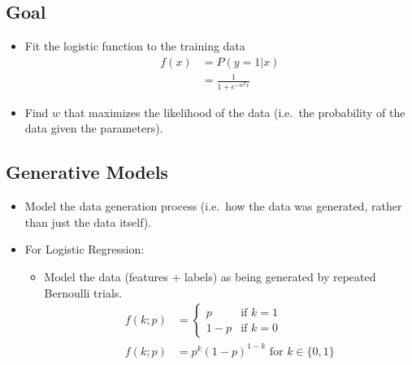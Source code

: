 \documentclass[12pt]{article}
\begin{document}
        \subsection{Goal}
            \begin{itemize}
                \item Fit the logistic function to the training data
                \begin{align*}
                    f(x) &= P(y = 1 | x) \\
                    &= \frac{1}{1 + e^{-{w^T}x}}
                \end{align*}
                \item Find $w$ that maximizes the likelihood of the data (i.e.\ the probability of the data given the parameters).
            \end{itemize}
        \subsection{Generative Models}
            \begin{itemize}
                \item Model the data generation process (i.e.\ how the data was generated, rather than just the data itself).
                \item For Logistic Regression:
                \begin{itemize}
                    \item Model the data (features $+$ labels) as being generated by repeated Bernoulli trials.
                    \begin{align*}
                        f(k; p) &= \begin{cases}
                            p & \text{if } k = 1 \\
                            1 - p & \text{if } k = 0
                        \end{cases} \\
                        f(k; p) &= p^k{(1 - p)}^{1 - k} \text{ for } k \in \{0, 1\}
                    \end{align*}
                \end{itemize}
            \end{itemize}
\end{document}
